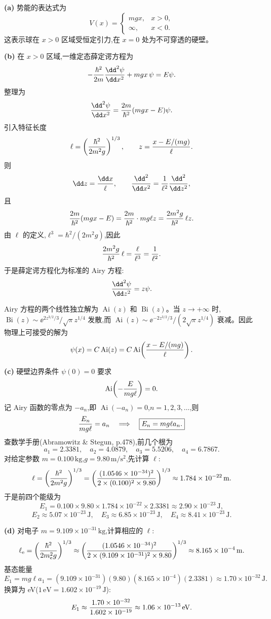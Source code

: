 \begin{solution}
\textbf{(a)} 势能的表达式为
\[
V(x)=\begin{cases}mgx, & x>0,\\ \infty, & x<0.\end{cases}
\]
这表示球在 $x>0$ 区域受恒定引力,在 $x=0$ 处为不可穿透的硬壁。

\textbf{(b)} 在 $x>0$ 区域,一维定态薛定谔方程为
\[
-{\hbar^2\over2m}{\dd^2\psi\over\dd x^2}+mgx\,\psi=E\psi.
\]
整理为
\[
{\dd^2\psi\over\dd x^2}={2m\over\hbar^2}(mgx-E)\psi.
\]
引入特征长度
\[
\ell=\left({\hbar^2\over2m^2g}\right)^{1/3},
\qquad
z={x-E/(mg)\over\ell}.
\]
则
\[
\dd z={\dd x\over\ell},\qquad
{\dd^2\over\dd x^2}={1\over\ell^2}{\dd^2\over\dd z^2},
\]
且
\[
{2m\over\hbar^2}(mgx-E)
={2m\over\hbar^2}\cdot mg\ell z
={2m^2g\over\hbar^2}\,\ell z.
\]
由 $\ell$ 的定义,$\ell^3=\hbar^2/(2m^2g)$,因此
\[
{2m^2g\over\hbar^2}\,\ell={\ell\over\ell^3}={1\over\ell^2}.
\]
于是薛定谔方程化为标准的 Airy 方程:
\[
{\dd^2\psi\over\dd z^2}=z\psi.
\]

Airy 方程的两个线性独立解为 $\operatorname{Ai}(z)$ 和 $\operatorname{Bi}(z)$。当 $z\to+\infty$ 时,$\operatorname{Bi}(z)\sim \ee^{2z^{3/2}/3}/\sqrt{\pi}z^{1/4}$ 发散,而 $\operatorname{Ai}(z)\sim \ee^{-2z^{3/2}/3}/(2\sqrt{\pi}z^{1/4})$ 衰减。因此物理上可接受的解为
\[
\psi(x)=C\operatorname{Ai}(z)=C\operatorname{Ai}\!\left({x-E/(mg)\over\ell}\right).
\]

\textbf{(c)} 硬壁边界条件 $\psi(0)=0$ 要求
\[
\operatorname{Ai}\!\left(-{E\over mg\ell}\right)=0.
\]
记 Airy 函数的零点为 $-a_n$,即 $\operatorname{Ai}(-a_n)=0$,$n=1,2,3,\ldots$,则
\[
{E_n\over mg\ell}=a_n\quad\Longrightarrow\quad
\boxed{E_n=mg\ell a_n.}
\]
查数学手册(Abramowitz \& Stegun, p.478),前几个根为
\[
a_1=2.3381,\quad a_2=4.0879,\quad a_3=5.5206,\quad a_4=6.7867.
\]
对给定参数 $m=0.100\,\mathrm{kg}$,$g=9.80\,\mathrm{m/s^2}$,先计算 $\ell$:
\[
\ell=\left({\hbar^2\over2m^2g}\right)^{1/3}
=\left({(1.0546\times10^{-34})^2\over2\times(0.100)^2\times9.80}\right)^{1/3}
\approx 1.784\times10^{-22}\,\mathrm{m}.
\]
于是前四个能级为
\[
E_1=0.100\times9.80\times1.784\times10^{-22}\times2.3381
\approx 2.90\times10^{-23}\,\mathrm{J},
\]
\[
E_2\approx 5.07\times10^{-23}\,\mathrm{J},\quad
E_3\approx 6.85\times10^{-23}\,\mathrm{J},\quad
E_4\approx 8.41\times10^{-23}\,\mathrm{J}.
\]

\textbf{(d)} 对电子 $m=9.109\times10^{-31}\,\mathrm{kg}$,计算相应的 $\ell$:
\[
\ell_{\rm e}=\left({\hbar^2\over2m_{\rm e}^2g}\right)^{1/3}
\approx\left({(1.0546\times10^{-34})^2\over2\times(9.109\times10^{-31})^2\times9.80}\right)^{1/3}
\approx 8.165\times10^{-4}\,\mathrm{m}.
\]
基态能量
\[
E_1=mg\ell a_1
=(9.109\times10^{-31})(9.80)(8.165\times10^{-4})(2.3381)
\approx 1.70\times10^{-32}\,\mathrm{J}.
\]
换算为 eV($1\,\mathrm{eV}=1.602\times10^{-19}\,\mathrm{J}$):
\[
E_1\approx {1.70\times10^{-32}\over1.602\times10^{-19}}
\approx 1.06\times10^{-13}\,\mathrm{eV}.
\]


\end{solution}
